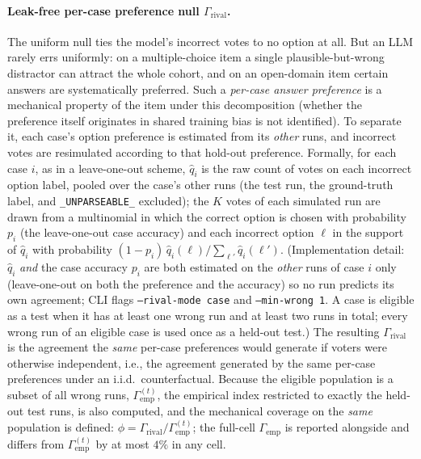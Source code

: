 \documentclass[a4paper,fleqn]{cas-sc}
\newcommand{\agreementIndex}{\Gamma}
\begin{document}
\paragraph{Leak-free per-case preference null $\agreementIndex_{\mathrm{rival}}$.}
The uniform null ties the model's incorrect votes to no option at all.
But an LLM rarely errs uniformly: on a multiple-choice item a single
plausible-but-wrong distractor can attract the whole cohort, and on an
open-domain item certain answers are systematically preferred. Such a
\emph{per-case answer preference} is a mechanical property of the item
under this decomposition (whether the preference itself originates in
shared training bias is not identified). To separate it, each case's option preference is estimated from its \emph{other} runs, and incorrect votes are
resimulated according to that hold-out preference. Formally, for each
case $i$, as in a leave-one-out scheme, $\hat q_i$ is the raw count of
votes on each incorrect option label, pooled over the case's other runs
(the test run, the ground-truth label, and \texttt{\_UNPARSEABLE\_}
excluded); the $K$ votes of each simulated run are drawn from a
multinomial in which the correct option is chosen with probability $p_i$
(the leave-one-out case accuracy) and each incorrect option $\ell$ in the
support of $\hat q_i$ with probability
$(1-p_i)\,\hat q_i(\ell)/\sum_{\ell'}\hat q_i(\ell')$. (Implementation detail:
$\hat q_i$ \emph{and} the case accuracy $p_i$ are both estimated on the
\emph{other} runs of case $i$ only (leave-one-out on both the
preference and the accuracy) so no
run predicts its own agreement; CLI flags \texttt{--rival-mode case} and
\texttt{--min-wrong 1}. A case is eligible as a test when it has at least
one wrong run and at least two runs in total; every wrong run of an
eligible case is used once as a held-out test.) The resulting
$\agreementIndex_{\mathrm{rival}}$ is the
agreement the \emph{same} per-case preferences would generate if voters
were otherwise independent, i.e., the agreement generated by the same
per-case preferences under an i.i.d.\ counterfactual. Because the eligible population is a
subset of all wrong runs, $\agreementIndex_{\mathrm{emp}}^{(t)}$, the empirical
index restricted to exactly the held-out test runs, is also computed,
and the mechanical coverage on the \emph{same} population is defined:
$\phi=\agreementIndex_{\mathrm{rival}}/\agreementIndex_{\mathrm{emp}}^{(t)}$; the
full-cell $\agreementIndex_{\mathrm{emp}}$ is reported alongside and differs from
$\agreementIndex_{\mathrm{emp}}^{(t)}$ by at most $4\%$ in any cell.
\end{document}
